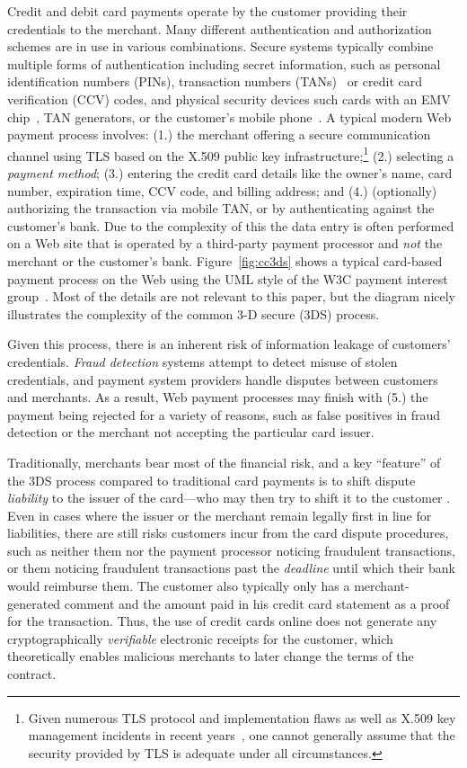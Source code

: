 \documentclass{llncs}
\begin{document}
Credit and debit card payments operate by the customer providing their
credentials to the merchant.  Many different authentication and
authorization schemes are in use in various combinations. Secure
systems typically combine multiple forms of authentication including
secret information, such as personal identification numbers (PINs),
transaction numbers (TANs)~\cite{kobil2016tan} or credit card
verification (CCV) codes, and physical security devices such cards
with an EMV chip~\cite{emv}, TAN generators, or the customer's mobile
phone~\cite{mtan}.  A typical modern Web payment process involves:
{(1.)} the merchant offering a secure communication channel using TLS
based on the X.509 public key infrastructure;\footnote{Given numerous
  TLS protocol and implementation flaws as well as X.509 key
  management incidents in recent years~\cite{holz2014}, one cannot
  generally assume that the security provided by TLS is adequate under
  all circumstances.}  {(2.)} selecting a {\em payment method}; {(3.)}
entering the credit card details like the owner's name, card number,
expiration time, CCV code, and billing address; and {(4.)}
(optionally) authorizing the transaction via mobile TAN, or by
authenticating against the customer's bank.  Due to the complexity
of this the data entry is often performed on a Web site that
is operated by a third-party payment processor and {\em not} the merchant or
the customer's bank.  Figure~\ref{fig:cc3ds} shows a typical card-based payment
process on the Web using the UML style of the W3C payment interest
group~\cite{pigs}.  Most of the details are not relevant to this
paper, but the diagram nicely illustrates the complexity of the common
3-D secure (3DS) process.

Given this process, there is an inherent risk of information leakage
of customers' credentials.  {\em Fraud detection} systems attempt to detect
misuse of stolen credentials, and payment system providers handle
disputes between customers and merchants.  As a result, Web payment
processes may finish with {(5.)} the payment being rejected for a
variety of reasons, such as false positives in fraud detection or
the merchant not accepting the particular card issuer.

Traditionally, merchants bear most of the financial risk, and a key
``feature'' of the 3DS process compared to traditional card payments
is to shift dispute {\em liability} to the issuer of the card---who
may then try to shift it to the customer \cite[\S2.4]{3DSsucks}.
%
%
Even in cases where the issuer or the merchant remain legally first in
line for liabilities, there are still risks customers incur from the
card dispute procedures, such as neither them nor the payment
processor noticing fraudulent transactions, or them noticing
fraudulent transactions past the {\em deadline} until which their bank
would reimburse them.  The customer also typically only has a
merchant-generated comment and the amount paid in his credit card
statement as a proof for the transaction.  Thus, the use of credit
cards online does not generate any cryptographically {\em verifiable}
electronic receipts for the customer, which theoretically enables
malicious merchants to later change the terms of the contract.
\end{document}
